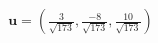 \documentclass[preview]{standalone}
\begin{document}
\begin{align*}
\mathbf{u} = \left(\frac{3}{\sqrt{173}}, \frac{-8}{\sqrt{173}}, \frac{10}{\sqrt{173}}\right)
\end{align*}
\end{document}
